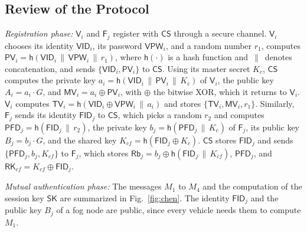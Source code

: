 \documentclass[journal]{IEEEtran}
\theoremstyle{plain}
\theoremstyle{definition}
\newcommand{\Veh}{\mathsf{V}}            %
\newcommand{\Fog}{\mathsf{F}}            %
\newcommand{\CS}{\mathsf{CS}}            %
\newcommand{\SK}{\mathsf{SK}}            %
\newcommand{\VID}{\mathsf{VID}}          %
\newcommand{\FID}{\mathsf{FID}}          %
\newcommand{\VPW}{\mathsf{VPW}}          %
\newcommand{\TV}{\mathsf{TV}}            %
\newcommand{\PV}{\mathsf{PV}}            %
\newcommand{\MV}{\mathsf{MV}}
\newcommand{\PFD}{\mathsf{PFD}}
\newcommand{\Rb}{\mathsf{Rb}}
\newcommand{\RK}{\mathsf{RK}}
\newcommand{\h}{\mathsf{h}}              %
\newcommand{\cat}{\,\|\,}               %
\begin{document}
\subsection{Review of the Protocol}
\emph{Registration phase:} $\Veh_i$ and $\Fog_j$ register with $\CS$ through a secure channel. $\Veh_i$ chooses its identity $\VID_i$, its password $\VPW_i$, and a random number $r_1$, computes $\PV_i=\h(\VID_i\cat\VPW_i\cat r_1)$, where $\h(\cdot)$ is a hash function and $\cat$ denotes concatenation, and sends $\{\VID_i,\PV_i\}$ to $\CS$. Using its master secret $K_c$, $\CS$ computes the private key $a_i=\h(\VID_i\cat\PV_i\cat K_c)$ of $\Veh_i$, the public key $A_i=a_i\cdot G$, and $\MV_i=a_i\oplus\PV_i$, with $\oplus$ the bitwise XOR, which it returns to $\Veh_i$. $\Veh_i$ computes $\TV_i=\h(\VID_i\oplus\VPW_i\cat a_i)$ and stores $\{\TV_i,\MV_i,r_1\}$. Similarly, $\Fog_j$ sends its identity $\FID_j$ to $\CS$, which picks a random $r_2$ and computes $\PFD_j=\h(\FID_j\cat r_2)$, the private key $b_j=\h(\PFD_j\cat K_c)$ of $\Fog_j$, its public key $B_j=b_j\cdot G$, and the shared key $K_{cf}=\h(\FID_j\oplus K_c)$. $\CS$ stores $\FID_j$ and sends $\{\PFD_j,b_j,K_{cf}\}$ to $\Fog_j$, which stores $\Rb_j=b_j\oplus\h(\FID_j\cat K_{cf})$, $\PFD_j$, and $\RK_{cf}=K_{cf}\oplus\FID_j$.

\emph{Mutual authentication phase:} The messages $M_1$ to $M_4$ and the computation of the session key $\SK$ are summarized in Fig.~\ref{fig:chen}. The identity $\FID_j$ and the public key $B_j$ of a fog node are public, since every vehicle needs them to compute $M_1$.
\end{document}
